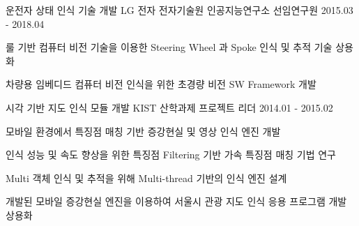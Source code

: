 


\begin{cventries}

  \cventry
    {운전자 상태 인식 기술 개발} %
    {LG 전자 전자기술원 인공지능연구소} %
    {선임연구원} %
    {2015.03 - 2018.04} %
    {
      \begin{cvitems} %
        \item {룰 기반 컴퓨터 비전 기술을 이용한 Steering Wheel 과 Spoke 인식 및 추적 기술 상용화}
        \item {차량용 임베디드 컴퓨터 비전 인식을 위한 초경량 비전 SW Framework 개발}
      \end{cvitems}
    }

  \cventry
    {시각 기반 지도 인식 모듈 개발} %
    {KIST 산학과제} %
    {프로젝트 리더} %
    {2014.01 - 2015.02} %
    {
      \begin{cvitems} %
        \item {모바일 환경에서 특징점 매칭 기반 증강현실 및 영상 인식 엔진 개발}
        \item {인식 성능 및 속도 향상을 위한 특징점 Filtering 기반 가속 특징점 매칭 기법 연구}
        \item {Multi 객체 인식 및 추적을 위해 Multi-thread 기반의 인식 엔진 설계}
        \item {개발된 모바일 증강현실 엔진을 이용하여 서울시 관광 지도 인식 응용 프로그램 개발 상용화}
      \end{cvitems}
    }


\end{cventries}
